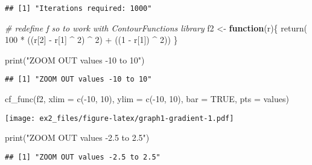 \documentclass[
]{article}
\newenvironment{Shaded}{\begin{snugshade}}{\end{snugshade}}
\newcommand{\AttributeTok}[1]{\textcolor[rgb]{0.77,0.63,0.00}{#1}}
\newcommand{\CommentTok}[1]{\textcolor[rgb]{0.56,0.35,0.01}{\textit{#1}}}
\newcommand{\ConstantTok}[1]{\textcolor[rgb]{0.00,0.00,0.00}{#1}}
\newcommand{\ControlFlowTok}[1]{\textcolor[rgb]{0.13,0.29,0.53}{\textbf{#1}}}
\newcommand{\DecValTok}[1]{\textcolor[rgb]{0.00,0.00,0.81}{#1}}
\newcommand{\FunctionTok}[1]{\textcolor[rgb]{0.00,0.00,0.00}{#1}}
\newcommand{\NormalTok}[1]{#1}
\newcommand{\OtherTok}[1]{\textcolor[rgb]{0.56,0.35,0.01}{#1}}
\newcommand{\SpecialCharTok}[1]{\textcolor[rgb]{0.00,0.00,0.00}{#1}}
\newcommand{\StringTok}[1]{\textcolor[rgb]{0.31,0.60,0.02}{#1}}
\begin{document}
\begin{verbatim}
## [1] "Iterations required: 1000"
\end{verbatim}

\begin{Shaded}
\begin{Highlighting}[]
\CommentTok{\# redefine f so to work with ContourFunctions library}
\NormalTok{f2 }\OtherTok{\textless{}{-}} \ControlFlowTok{function}\NormalTok{(r)\{}
 \FunctionTok{return}\NormalTok{( }\DecValTok{100} \SpecialCharTok{*}\NormalTok{ ((r[}\DecValTok{2}\NormalTok{] }\SpecialCharTok{{-}}\NormalTok{ r[}\DecValTok{1}\NormalTok{] }\SpecialCharTok{\^{}} \DecValTok{2}\NormalTok{) }\SpecialCharTok{\^{}} \DecValTok{2}\NormalTok{) }\SpecialCharTok{+}\NormalTok{ ((}\DecValTok{1} \SpecialCharTok{{-}}\NormalTok{ r[}\DecValTok{1}\NormalTok{]) }\SpecialCharTok{\^{}} \DecValTok{2}\NormalTok{)) }
\NormalTok{\}}

\FunctionTok{print}\NormalTok{(}\StringTok{"ZOOM OUT values {-}10 to 10"}\NormalTok{)}
\end{Highlighting}
\end{Shaded}

\begin{verbatim}
## [1] "ZOOM OUT values -10 to 10"
\end{verbatim}

\begin{Shaded}
\begin{Highlighting}[]
\FunctionTok{cf\_func}\NormalTok{(f2, }\AttributeTok{xlim =} \FunctionTok{c}\NormalTok{(}\SpecialCharTok{{-}}\DecValTok{10}\NormalTok{, }\DecValTok{10}\NormalTok{), }\AttributeTok{ylim =} \FunctionTok{c}\NormalTok{(}\SpecialCharTok{{-}}\DecValTok{10}\NormalTok{, }\DecValTok{10}\NormalTok{), }\AttributeTok{bar =} \ConstantTok{TRUE}\NormalTok{, }\AttributeTok{pts =}\NormalTok{ values)}
\end{Highlighting}
\end{Shaded}

\texttt{[image: ex2\_files/figure-latex/graph1-gradient-1.pdf]}

\begin{Shaded}
\begin{Highlighting}[]
\FunctionTok{print}\NormalTok{(}\StringTok{"ZOOM OUT values {-}2.5 to 2.5"}\NormalTok{)}
\end{Highlighting}
\end{Shaded}

\begin{verbatim}
## [1] "ZOOM OUT values -2.5 to 2.5"
\end{verbatim}
\end{document}
